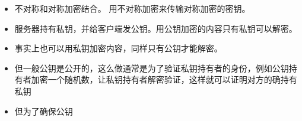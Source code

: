 
\begin{itemize}
\item 不对称和对称加密结合。 用不对称加密来传输对称加密的密钥。
\item 服务器持有私钥，并给客户端发公钥。用公钥加密的内容只有私钥可以解密。
\item 事实上也可以用私钥加密内容，同样只有公钥才能解密。
\item 但一般公钥是公开的，这么做通常是为了验证私钥持有者的身份，例如公钥持有者加密一个随机数，让私钥持有者解密验证，这样就可以证明对方的确持有私钥
\item 但为了确保公钥
\end{itemize}

